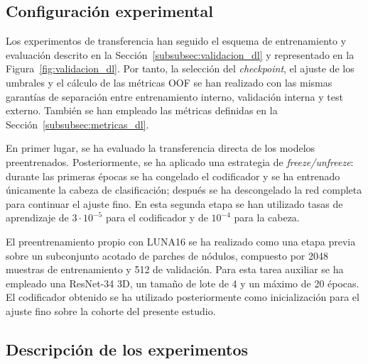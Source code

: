 

\subsection{Configuración experimental}

Los experimentos de transferencia han seguido el esquema de entrenamiento y evaluación descrito en la Sección~\ref{subsubsec:validacion_dl} y representado en la Figura~\ref{fig:validacion_dl}. Por tanto, la selección del \textit{checkpoint}, el ajuste de los umbrales y el cálculo de las métricas OOF se han realizado con las mismas garantías de separación entre entrenamiento interno, validación interna y test externo. También se han empleado las métricas definidas en la Sección~\ref{subsubsec:metricas_dl}.

En primer lugar, se ha evaluado la transferencia directa de los modelos preentrenados. Posteriormente, se ha aplicado una estrategia de \textit{freeze/unfreeze}: durante las primeras épocas se ha congelado el codificador y se ha entrenado únicamente la cabeza de clasificación; después se ha descongelado la red completa para continuar el ajuste fino. En esta segunda etapa se han utilizado tasas de aprendizaje de $3 \cdot 10^{-5}$ para el codificador y de $10^{-4}$ para la cabeza.

El preentrenamiento propio con LUNA16 se ha realizado como una etapa previa sobre un subconjunto acotado de parches de nódulos, compuesto por 2048 muestras de entrenamiento y 512 de validación. Para esta tarea auxiliar se ha empleado una ResNet-34 3D, un tamaño de lote de 4 y un máximo de 20 épocas. El codificador obtenido se ha utilizado posteriormente como inicialización para el ajuste fino sobre la cohorte del presente estudio.


\subsection{Descripción de los experimentos}

